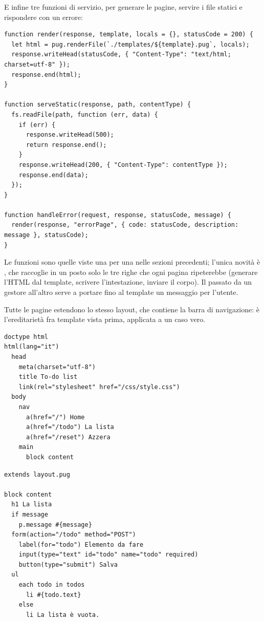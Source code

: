 E infine tre funzioni di servizio, per generare le pagine, servire i file
statici e rispondere con un errore:

\begin{lstlisting}[style=js, name=app.js, firstnumber=last]
function render(response, template, locals = {}, statusCode = 200) {
  let html = pug.renderFile(`./templates/${template}.pug`, locals);
  response.writeHead(statusCode, { "Content-Type": "text/html; charset=utf-8" });
  response.end(html);
}

function serveStatic(response, path, contentType) {
  fs.readFile(path, function (err, data) {
    if (err) {
      response.writeHead(500);
      return response.end();
    }
    response.writeHead(200, { "Content-Type": contentType });
    response.end(data);
  });
}

function handleError(request, response, statusCode, message) {
  render(response, "errorPage", { code: statusCode, description: message }, statusCode);
}
\end{lstlisting}

Le funzioni sono quelle viste una per una nelle sezioni precedenti; l'unica
novità è , che raccoglie in un posto solo le tre righe che ogni
pagina ripeterebbe (generare l'HTML dal template, scrivere l'intestazione,
inviare il corpo). Il  passato da un gestore all'altro serve a
portare fino al template un messaggio per l'utente.

Tutte le pagine estendono lo stesso layout, che contiene la barra di
navigazione: è l'ereditarietà fra template vista prima, applicata a un caso
vero.

\begin{affianco}[0.5]
\begin{lstlisting}[style=pug, name=templates/layout.pug]
doctype html
html(lang="it")
  head
    meta(charset="utf-8")
    title To-do list
    link(rel="stylesheet" href="/css/style.css")
  body
    nav
      a(href="/") Home
      a(href="/todo") La lista
      a(href="/reset") Azzera
    main
      block content
\end{lstlisting}
\risultato
\begin{lstlisting}[style=pug, name=templates/todo.pug]
extends layout.pug

block content
  h1 La lista
  if message
    p.message #{message}
  form(action="/todo" method="POST")
    label(for="todo") Elemento da fare
    input(type="text" id="todo" name="todo" required)
    button(type="submit") Salva
  ul
    each todo in todos
      li #{todo.text}
    else
      li La lista è vuota.
\end{lstlisting}
\end{affianco}

